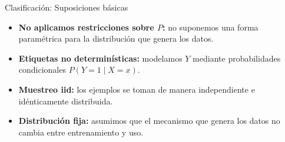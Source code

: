 \documentclass[aspectratio=169, 10pt]{beamer}
\begin{document}
\begin{frame}{Clasificación: Suposiciones básicas}
  \begin{itemize}
    \large
    \setlength{\itemsep}{0.45em}
    \item \textbf{No aplicamos restricciones sobre $P$:} no suponemos una forma paramétrica para la distribución que genera los datos.
    \pause
    \item \textbf{Etiquetas no determinísticas:} modelamos $Y$ mediante probabilidades condicionales $P(Y=1\mid X=x)$.
    \pause
    \item \textbf{Muestreo iid:} los ejemplos se toman de manera independiente e idénticamente distribuida.
    \pause
    \item \textbf{Distribución fija:} asumimos que el mecanismo que genera los datos no cambia entre entrenamiento y uso.
  \end{itemize}
\end{frame}



\end{document}
